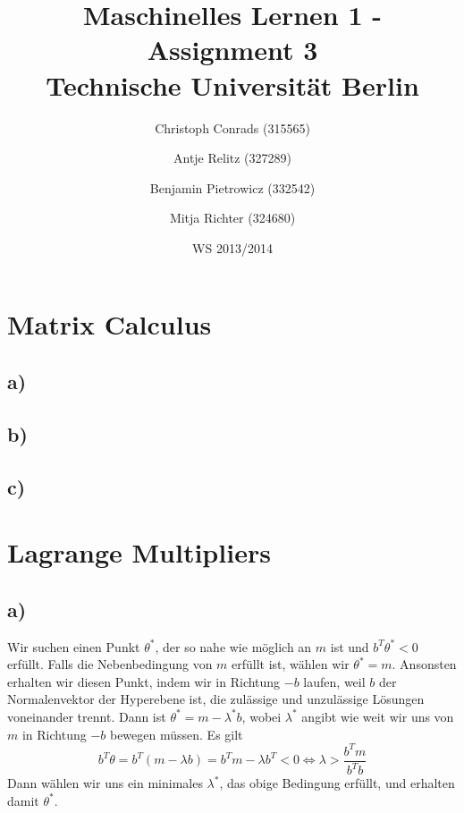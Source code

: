 \documentclass[paper=a4,fontsize=10pt,DIV11,BCOR10mm]{scrartcl}
\begin{document}
\title{Maschinelles Lernen 1 - Assignment 3\\
\small{Technische Universität Berlin}}


\author{\small{Christoph Conrads (315565)}\and \small{Antje Relitz (327289)}  \and \small{Benjamin Pietrowicz (332542)} \and \small{Mitja Richter (324680)} }

\date{WS 2013/2014}

\maketitle


\section{Matrix Calculus}

\subsection*{a)}

\subsection*{b)}

\subsection*{c)}





\section{Lagrange Multipliers}

\subsection*{a)}

Wir suchen einen Punkt $\theta^*$, der so nahe wie möglich an $m$ ist und $b^T \theta^* < 0$ erfüllt. Falls die Nebenbedingung von $m$ erfüllt ist, wählen wir $\theta^* = m$. Ansonsten erhalten wir diesen Punkt, indem wir in Richtung $-b$ laufen, weil $b$ der Normalenvektor der Hyperebene ist, die zulässige und unzulässige Lösungen voneinander trennt. Dann ist $\theta^* = m - \lambda^* b$, wobei $\lambda^*$ angibt wie weit wir uns von $m$ in Richtung $-b$ bewegen müssen. Es gilt
\[ b^T \theta = b^T (m - \lambda b) = b^T m - \lambda b^T < 0 \Leftrightarrow \lambda > \frac{b^T m}{b^T b} \]
Dann wählen wir uns ein minimales $\lambda^*$, das obige Bedingung erfüllt, und erhalten damit $\theta^*$.
\end{document}
